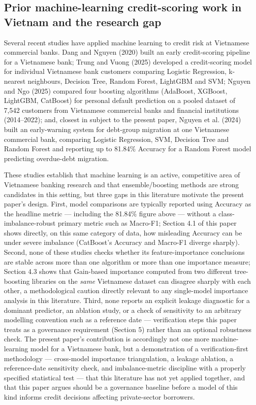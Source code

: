 \documentclass[11pt,a4paper]{article}
\begin{document}
\subsection{Prior machine-learning credit-scoring work in Vietnam and the research gap}

Several recent studies have applied machine learning to credit risk at Vietnamese commercial banks. Dang and Nguyen (2020) built an early credit-scoring pipeline for a Vietnamese bank; Trung and Vuong (2025) developed a credit-scoring model for individual Vietnamese bank customers comparing Logistic Regression, k-nearest neighbours, Decision Tree, Random Forest, LightGBM and SVM; Nguyen and Ngo (2025) compared four boosting algorithms (AdaBoost, XGBoost, LightGBM, CatBoost) for personal default prediction on a pooled dataset of 7{,}542 customers from Vietnamese commercial banks and financial institutions (2014--2022); and, closest in subject to the present paper, Nguyen et al. (2024) built an early-warning system for debt-group migration at one Vietnamese commercial bank, comparing Logistic Regression, SVM, Decision Tree and Random Forest and reporting up to 81.84\% Accuracy for a Random Forest model predicting overdue-debt migration.

These studies establish that machine learning is an active, competitive area of Vietnamese banking research and that ensemble/boosting methods are strong candidates in this setting, but three gaps in this literature motivate the present paper's design. First, model comparisons are typically reported using Accuracy as the headline metric --- including the 81.84\% figure above --- without a class-imbalance-robust primary metric such as Macro-F1; Section 4.1 of this paper shows directly, on this same category of data, how misleading Accuracy can be under severe imbalance (CatBoost's Accuracy and Macro-F1 diverge sharply). Second, none of these studies checks whether its feature-importance conclusions are stable across more than one algorithm or more than one importance measure; Section 4.3 shows that Gain-based importance computed from two different tree-boosting libraries on the \textit{same} Vietnamese dataset can disagree sharply with each other, a methodological caution directly relevant to any single-model importance analysis in this literature. Third, none reports an explicit leakage diagnostic for a dominant predictor, an ablation study, or a check of sensitivity to an arbitrary modelling convention such as a reference date --- verification steps this paper treats as a governance requirement (Section 5) rather than an optional robustness check. The present paper's contribution is accordingly not one more machine-learning model for a Vietnamese bank, but a demonstration of a verification-first methodology --- cross-model importance triangulation, a leakage ablation, a reference-date sensitivity check, and imbalance-metric discipline with a properly specified statistical test --- that this literature has not yet applied together, and that this paper argues should be a governance baseline before a model of this kind informs credit decisions affecting private-sector borrowers.
\end{document}
